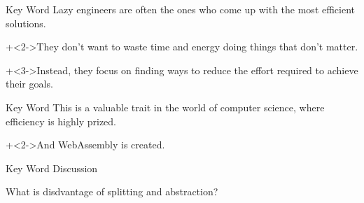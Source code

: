 \begin{frame}{Key Word}{}
    Lazy engineers are often the ones who come up with the most efficient solutions.
    \vspace{4ex}

    \onslide+<2->{They don't want to waste time and energy doing things that don't matter.}
    \vspace{4ex}

    \onslide+<3->{Instead, they focus on finding ways to reduce the effort required to achieve their goals.}
\end{frame}


\begin{frame}{Key Word}{}
    This is a valuable trait in the world of computer science, where efficiency is highly prized.
    \vspace{4ex}

    \onslide+<2->{And WebAssembly is created.}
\end{frame}


\begin{frame}{Key Word}{}
    Discussion
    \vspace{4ex}

    What is disdvantage of splitting and abstraction?
\end{frame}
